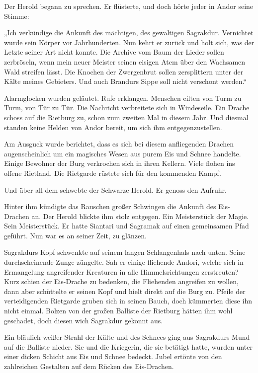Der Herold begann zu sprechen. Er flüsterte, und doch hörte jeder in Andor seine Stimme:

„Ich verkündige die Ankunft des mächtigen, des gewaltigen Sagrakdur. Vernichtet wurde sein Körper vor Jahrhunderten. Nun kehrt er zurück und holt sich, was der Letzte seiner Art nicht konnte. Die Archive vom Baum der Lieder sollen zerbröseln, wenn mein neuer Meister seinen eisigen Atem über den Wachsamen Wald streifen lässt. Die Knochen der Zwergenbrut sollen zersplittern unter der Kälte meines Gebieters. Und auch Brandurs Sippe soll nicht verschont werden.“

Alarmglocken wurden geläutet. Rufe erklangen. Menschen eilten von Turm zu Turm, von Tür zu Tür. Die Nachricht verbreitete sich in Windeseile. Ein Drache schoss auf die Rietburg zu, schon zum zweiten Mal in diesem Jahr. Und diesmal standen keine Helden von Andor bereit, um sich ihm entgegenzustellen.

Am Ausguck wurde berichtet, dass es sich bei diesem anfliegenden Drachen augenscheinlich um ein magisches Wesen aus purem Eis und Schnee handelte. Einige Bewohner der Burg verkrochen sich in ihren Kellern. Viele flohen ins offene Rietland. Die Rietgarde rüstete sich für den kommenden Kampf.

Und über all dem schwebte der Schwarze Herold. Er genoss den Aufruhr.

Hinter ihm kündigte das Rauschen großer Schwingen die Ankunft des Eis-Drachen an. Der Herold blickte ihm stolz entgegen. Ein Meisterstück der Magie. Sein Meisterstück. Er hatte Siantari und Sagramak auf einen gemeinsamen Pfad geführt. Nun war es an seiner Zeit, zu glänzen.

Sagrakdurs Kopf schwenkte auf seinem langen Schlangenhals nach unten. Seine durchscheinende Zunge züngelte. Sah er einige fliehende Andori, welche sich in Ermangelung angreifender Kreaturen in alle Himmelsrichtungen zerstreuten? Kurz schien der Eis-Drache zu bedenken, die Fliehenden angreifen zu wollen, dann aber schüttelte er seinen Kopf und hielt direkt auf die Burg zu. Pfeile der verteidigenden Rietgarde gruben sich in seinen Bauch, doch kümmerten diese ihn nicht einmal. Bolzen von der großen Balliste der Rietburg hätten ihm wohl geschadet, doch diesen wich Sagrakdur gekonnt aus.

Ein bläulich-weißer Strahl der Kälte und des Schnees ging aus Sagrakdurs Mund auf die Balliste nieder. Sie und die Kriegerin, die sie betätigt hatte, wurden unter einer dicken Schicht aus Eis und Schnee bedeckt. Jubel ertönte von den zahlreichen Gestalten auf dem Rücken des Eis-Drachen.

